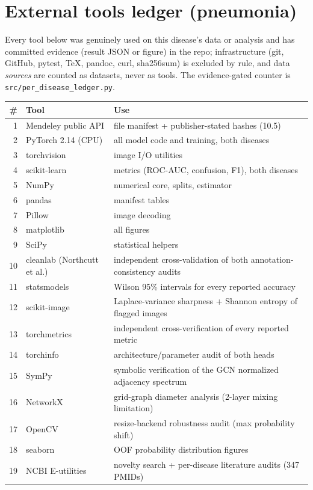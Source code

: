 
\section{External tools ledger (pneumonia)}
Every tool below was genuinely used on this disease's data or analysis and
has committed evidence (result JSON or figure) in the repo; infrastructure
(git, GitHub, pytest, \TeX, pandoc, curl, sha256sum) is excluded by rule,
and data \emph{sources} are counted as datasets, never as tools. The
evidence-gated counter is \texttt{src/per\_disease\_ledger.py}.
\begin{longtable}{r p{4.6cm} p{8.2cm}}
\hline \# & Tool & Use \\ \hline \endhead
1 & Mendeley public API & file manifest + publisher-stated hashes (10.5) \\
2 & PyTorch 2.14 (CPU) & all model code and training, both diseases \\
3 & torchvision & image I/O utilities \\
4 & scikit-learn & metrics (ROC-AUC, confusion, F1), both diseases \\
5 & NumPy & numerical core, splits, estimator \\
6 & pandas & manifest tables \\
7 & Pillow & image decoding \\
8 & matplotlib & all figures \\
9 & SciPy & statistical helpers \\
10 & cleanlab (Northcutt et al.) & independent cross-validation of both annotation-consistency audits \\
11 & statsmodels & Wilson 95\% intervals for every reported accuracy \\
12 & scikit-image & Laplace-variance sharpness + Shannon entropy of flagged images \\
13 & torchmetrics & independent cross-verification of every reported metric \\
14 & torchinfo & architecture/parameter audit of both heads \\
15 & SymPy & symbolic verification of the GCN normalized adjacency spectrum \\
16 & NetworkX & grid-graph diameter analysis (2-layer mixing limitation) \\
17 & OpenCV & resize-backend robustness audit (max probability shift) \\
18 & seaborn & OOF probability distribution figures \\
19 & NCBI E-utilities & novelty search + per-disease literature audits (347 PMIDs) \\

\end{longtable}
